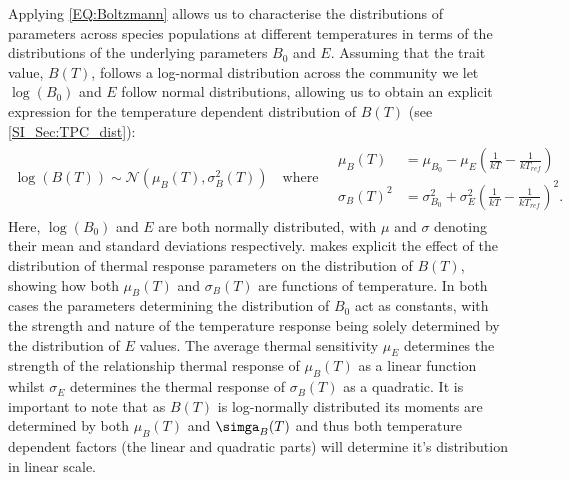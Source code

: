 \documentclass{article}
\begin{document}
Applying \cref{EQ:Boltzmann} allows us to characterise the distributions of parameters across species populations at different temperatures in terms of the distributions of the underlying parameters $B_0$ and $E$. Assuming that the trait value, $B(T)$, follows a log-normal distribution across the community we let $\log(B_0)$ and $E$ follow normal distributions, allowing us to obtain an explicit expression for the temperature dependent distribution of $B(T)$ (see \cref{SI_Sec:TPC_dist}):
\begin{align} \label{EQ:Boltz_dist}
    \log(B(T)) \sim \mathcal{N}\left(\mu_{B}(T) , \sigma_{B}^2(T) \right) 
    \quad \text{where} \quad
    \begin{array}{cc}
        \mu_B(T) &= \mu_{B_0} - \mu_{E} \left(\frac{1}{kT} - \frac{1}{k T_{ref} }\right)  \\
        \sigma_{B}(T)^2 &= \sigma_{B_0}^2 + \sigma_{E}^2 \left(\frac{1}{kT} - \frac{1}{k T_{ref} }\right)^2 .
    \end{array}
\end{align}
Here, $\log(B_0)$ and $E$ are both normally distributed, with $\mu$ and $\sigma$ denoting their mean and standard deviations respectively.  makes explicit the effect of the distribution of thermal response parameters on the distribution of $B(T)$, showing how both $\mu_B(T)$ and $\sigma_B(T)$ are functions of temperature. In both cases the parameters determining the distribution of $B_0$ act as constants, with the strength and nature of the temperature response being solely determined by the distribution of $E$ values. The average thermal sensitivity $\mu_E$ determines the strength of the relationship thermal response of $\mu_B(T)$ as a linear function whilst $\sigma_E$ determines the thermal response of $\sigma_B(T)$ as a quadratic. It is important to note that as $B(T)$ is log-normally distributed its moments are determined by both $\mu_B(T)$ and $\simga_B(T)$ and thus both temperature dependent factors (the linear and quadratic parts) will determine it's distribution in linear scale.
\end{document}
